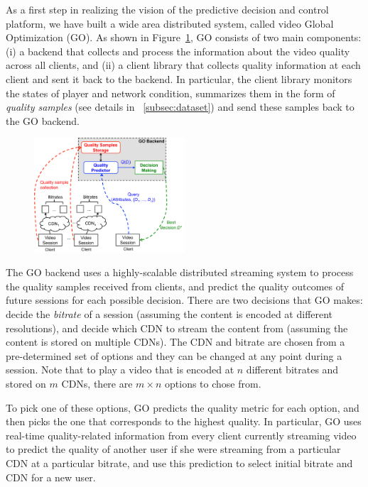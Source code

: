 As a first step in realizing the vision of the predictive decision and control 
platform, we have built a wide area distributed system, called video Global 
Optimization (GO). As shown in
Figure~\ref{fig:go-overview}, GO consists of two main components: (i)
a backend that collects and process the information about the video
quality across all clients, and (ii) a client library that collects
quality information at each client and sent it back to the backend. In
particular, the client library monitors the states of player and
network condition, summarizes them in the form of \emph{quality
  samples} (see details in \Section~\ref{subsec:dataset}) and send
these samples back to the GO backend.

\begin{figure}[h!]
\centering
 \includegraphics[width=0.5\textwidth] {figures/go-overview.pdf}
\label{fig:go-overview}
\end{figure}
 
The GO backend uses a highly-scalable distributed streaming system to
process the quality samples received from clients, and predict the
quality outcomes of future sessions for each possible decision. There
are two decisions that GO makes: decide the {\it bitrate} of a session
(assuming the content is encoded at different resolutions), and decide
which CDN to stream the content from (assuming the content is stored
on multiple CDNs). The CDN and bitrate are chosen from a
pre-determined set of options and they can be changed at any point
during a session. Note that to play a video that is encoded at $n$
different bitrates and stored on $m$ CDNs, there are $m\times n$
options to chose from.  

To pick one of these options, GO predicts the quality metric for each
option, and then picks the one that corresponds to the highest
quality. In particular, GO uses real-time quality-related information
from every client currently streaming video to predict the quality of
another user if she were streaming from a particular CDN at a
particular bitrate, and use this prediction to select initial bitrate
and CDN for a new user.

